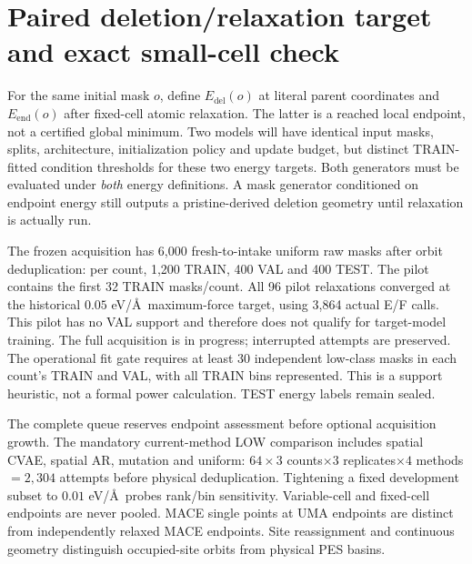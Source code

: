 \documentclass[10pt]{article}
\begin{document}
\section{Paired deletion/relaxation target and exact small-cell check}
For the same initial mask $o$, define $E_{\mathrm{del}}(o)$ at literal parent
coordinates and $E_{\mathrm{end}}(o)$ after fixed-cell atomic relaxation.
The latter is a reached local endpoint, not a certified global minimum. Two
models will have identical input masks, splits, architecture, initialization
policy and update budget, but distinct TRAIN-fitted condition thresholds for
these two energy targets. Both generators must be evaluated under \emph{both}
energy definitions. A mask generator conditioned on endpoint energy still
outputs a pristine-derived deletion geometry until relaxation is actually run.

The frozen acquisition has 6,000 fresh-to-intake uniform raw masks after orbit
deduplication: per count, 1,200 TRAIN, 400 VAL and 400 TEST. The pilot contains
the first 32 TRAIN masks/count. All 96 pilot relaxations converged at the
historical $0.05$ eV/\AA\ maximum-force target, using 3,864 actual E/F calls.
This pilot has no VAL support and therefore does not qualify for target-model
training. The full acquisition is in progress; interrupted attempts are preserved.
The operational fit gate requires at least 30 independent low-class masks in
each count's TRAIN and VAL, with all TRAIN bins represented. This is a support
heuristic, not a formal power calculation. TEST energy labels remain sealed.

The complete queue reserves endpoint assessment before optional acquisition
growth. The mandatory current-method LOW comparison includes spatial CVAE,
spatial AR, mutation and uniform: $64\times 3$ counts$\times 3$ replicates$\times 4$
methods$=2,304$ attempts before physical deduplication. Tightening a fixed
development subset to $0.01$ eV/\AA\ probes rank/bin sensitivity. Variable-cell
and fixed-cell endpoints are never pooled. MACE single points at UMA endpoints
are distinct from independently relaxed MACE endpoints. Site reassignment and
continuous geometry distinguish occupied-site orbits from physical PES basins.
\end{document}
